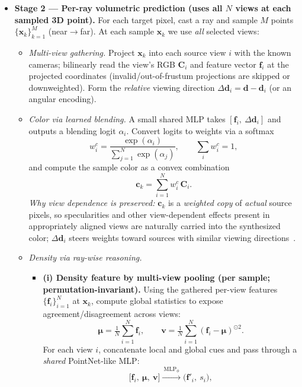 \begin{enrichment}
\begin{enrichment}
\begin{itemize}
         \item \textbf{Stage 2 — Per-ray volumetric prediction (uses all $N$ views at each sampled 3D point).}
         For each target pixel, cast a ray and sample $M$ points $\{\mathbf{x}_k\}_{k=1}^{M}$ (near$\rightarrow$far). At each sample $\mathbf{x}_k$ we use \emph{all} selected views:
         \begin{itemize}
             \item \emph{Multi-view gathering.} Project $\mathbf{x}_k$ into each source view $i$ with the known cameras; bilinearly read the view’s RGB $\mathbf{C}_i$ and feature vector $\mathbf{f}_i$ at the projected coordinates (invalid/out-of-frustum projections are skipped or downweighted). Form the \emph{relative} viewing direction $\Delta\mathbf{d}_i=\mathbf{d}-\mathbf{d}_i$ (or an angular encoding).
             \item \emph{Color via learned blending.} A small shared MLP takes $[\mathbf{f}_i,\ \Delta\mathbf{d}_i]$ and outputs a blending logit $\alpha_i$. Convert logits to weights via a softmax
             \[
             w_i^{c}=\frac{\exp(\alpha_i)}{\sum_{j=1}^{N} \exp(\alpha_j)},\qquad \sum_i w_i^{c}=1,
             \]
             and compute the sample color as a convex combination
             \[
             \mathbf{c}_k=\sum_{i=1}^{N} w_i^{c}\,\mathbf{C}_i.
             \]
             \emph{Why view dependence is preserved:} $\mathbf{c}_k$ is a \emph{weighted copy} of \emph{actual} source pixels, so specularities and other view-dependent effects present in appropriately aligned views are naturally carried into the synthesized color; $\Delta\mathbf{d}_i$ steers weights toward sources with similar viewing directions~\cite{wang2021_ibrnet}.
             \item \emph{Density via ray-wise reasoning.}
             \begin{itemize}
                 \item \textbf{(i) Density feature by multi-view pooling (per sample; permutation-invariant).} Using the gathered per-view features $\{\mathbf{f}_i\}_{i=1}^{N}$ at $\mathbf{x}_k$, compute global statistics to expose agreement/disagreement across views:
                 \[
                 \boldsymbol{\mu}=\tfrac{1}{N}\sum_{i=1}^{N}\mathbf{f}_i,\qquad
                 \mathbf{v}=\tfrac{1}{N}\sum_{i=1}^{N}(\mathbf{f}_i-\boldsymbol{\mu})^{\odot 2}.
                 \]
                 For each view $i$, concatenate local and global cues and pass through a \emph{shared} PointNet-like MLP:
                 \[
                 \big[\mathbf{f}_i,\ \boldsymbol{\mu},\ \mathbf{v}\big]\xrightarrow{\ \mathrm{MLP}_\phi\ }\big(\mathbf{f}'_i,\ s_i\big),
\]
\end{itemize}
\end{itemize}
\end{itemize}
\end{enrichment}
\end{enrichment}
